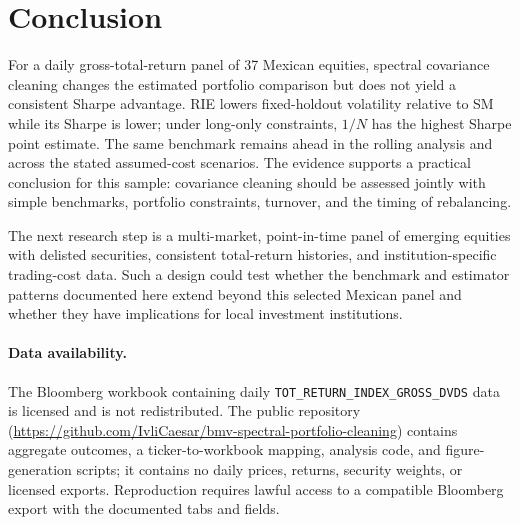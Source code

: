 \documentclass[11pt]{article}
\begin{document}
\section{Conclusion}

For a daily gross-total-return panel of 37 Mexican equities, spectral
covariance cleaning changes the estimated portfolio comparison but does not
yield a consistent Sharpe advantage. RIE lowers fixed-holdout volatility
relative to SM while its Sharpe is lower; under long-only constraints, $1/N$
has the highest Sharpe point estimate. The same benchmark remains ahead in
the rolling analysis and across the stated assumed-cost scenarios. The
evidence supports a practical conclusion for this sample: covariance
cleaning should be assessed jointly with simple benchmarks, portfolio
constraints, turnover, and the timing of rebalancing.

The next research step is a multi-market, point-in-time panel of emerging
equities with delisted securities, consistent total-return histories, and
institution-specific trading-cost data. Such a design could test whether
the benchmark and estimator patterns documented here extend beyond this
selected Mexican panel and whether they have implications for local
investment institutions.

\paragraph{Data availability.}
The Bloomberg workbook containing daily
\texttt{TOT\_RETURN\_INDEX\_GROSS\_DVDS} data is licensed and is not
redistributed. The public repository
(\url{https://github.com/IvliCaesar/bmv-spectral-portfolio-cleaning})
contains aggregate outcomes, a ticker-to-workbook mapping, analysis code,
and figure-generation scripts; it contains no daily prices, returns,
security weights, or licensed exports. Reproduction requires lawful access
to a compatible Bloomberg export with the documented tabs and fields.
\end{document}

